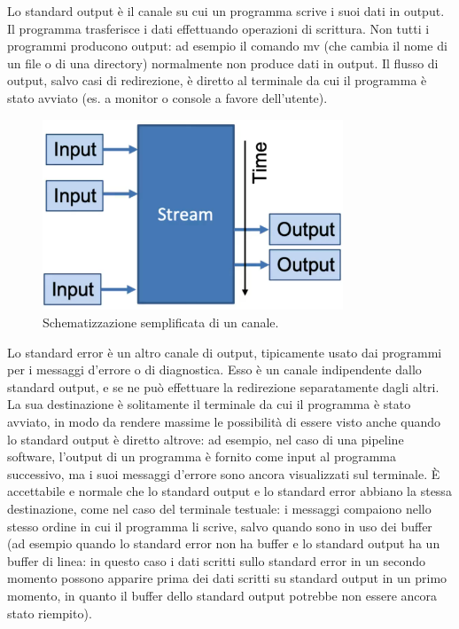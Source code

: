 Lo standard output è il canale su cui un programma scrive i suoi dati in output. Il programma trasferisce i dati effettuando operazioni di scrittura. Non tutti i programmi producono output: ad esempio il comando mv (che cambia il nome di un file o di una directory) normalmente non produce dati in output.
Il flusso di output, salvo casi di redirezione, è diretto al terminale da cui il programma è stato avviato (es. a monitor o console a favore dell'utente). 

\begin{figure}
	\centering
	\includegraphics[width=0.8\textwidth]{img/streams.png}
	\caption{Schematizzazione semplificata di un canale.}
	\label{fig:streams}
\end{figure}

Lo standard error è un altro canale di output, tipicamente usato dai programmi per i messaggi d'errore o di diagnostica. Esso è un canale indipendente dallo standard output, e se ne può effettuare la redirezione separatamente dagli altri. La sua destinazione è solitamente il terminale da cui il programma è stato avviato, in modo da rendere massime le possibilità di essere visto anche quando lo standard output è diretto altrove: ad esempio, nel caso di una pipeline software, l'output di un programma è fornito come input al programma successivo, ma i suoi messaggi d'errore sono ancora visualizzati sul terminale.
È accettabile e normale che lo standard output e lo standard error abbiano la stessa destinazione, come nel caso del terminale testuale: i messaggi compaiono nello stesso ordine in cui il programma li scrive, salvo quando sono in uso dei buffer (ad esempio quando lo standard error non ha buffer e lo standard output ha un buffer di linea: in questo caso i dati scritti sullo standard error in un secondo momento possono apparire prima dei dati scritti su standard output in un primo momento, in quanto il buffer dello standard output potrebbe non essere ancora stato riempito). 

